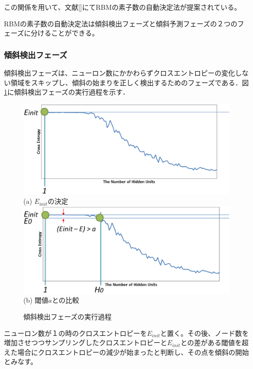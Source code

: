 この関係を用いて、文献[]にてRBMの素子数の自動決定法が提案されている。

RBMの素子数の自動決定法は傾斜検出フェーズと傾斜予測フェーズの２つのフェーズに分けることができる。

\subsubsection{傾斜検出フェーズ}
傾斜検出フェーズは、ニューロン数にかかわらずクロスエントロピーの変化しない領域をスキップし、傾斜の始まりを正しく検出するためのフェーズである．図\ref{fig:phase1}に傾斜検出フェーズの実行過程を示す．

\begin{figure}[]
\begin{center}
  \includegraphics[scale=0.25]{./myimg/phase1_1.eps} \\
  (a) $E_{init}$の決定 \\
  \includegraphics[scale=0.25]{./myimg/phase1_3.eps} \\
  (b) 閾値$a$との比較 \\
  \caption{傾斜検出フェーズの実行過程}
  \label{fig:phase1}
\end{center}
\end{figure}

ニューロン数が１の時のクロスエントロピーを$E_{init}$と置く。その後、ノード数を増加させつつサンプリングしたクロスエントロピーと$E_{init}$との差がある閾値を超えた場合にクロスエントロピーの減少が始まったと判断し、その点を傾斜の開始とみなす。

